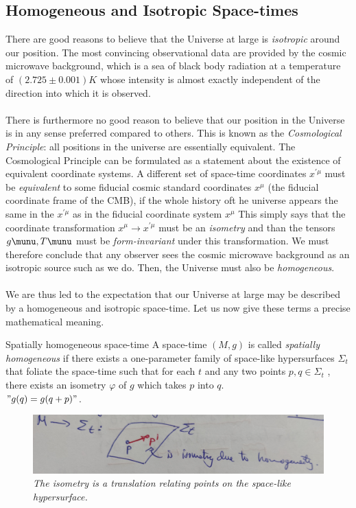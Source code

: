 	
	\subsection{Homogeneous and Isotropic Space-times}
	There are good reasons to believe that the Universe at large is \emph{isotropic}
	around our position. The most convincing observational data are provided by the cosmic microwave background, which is a sea of black body
	radiation at a temperature of $(2.725 ± 0.001) K$ whose intensity is almost
	exactly independent of the direction into which it is observed.\\
	\\
	There is furthermore no good reason to believe that our position in the
	Universe is in any sense preferred compared to others.  This is known as the \emph{Cosmological Principle}: all positions in the universe are essentially equivalent. The Cosmological Principle can be formulated as a statement about the existence of equivalent coordinate systems. A different set of space-time coordinates $x^{\prime \mu}$ must be \emph{equivalent} to some fiducial cosmic standard coordinates $x^\mu$ (the fiducial coordinate frame of the CMB), if the whole history oft he universe appears the same in the $x^{\prime \mu}$ as in the fiducial coordinate system $x^\mu$ This simply says that the coordinate transformation $x^\mu\rightarrow x^{\prime\mu}$ must be an \emph{isometry} and than the tensors $g\munu, T\munu$ must be \emph{form-invariant} under this transformation. We must therefore
	conclude that any observer sees the cosmic microwave background as an isotropic source such as we do. Then, the Universe must also be
	\emph{homogeneous}.\\
	\\
	We are thus led to the expectation that our Universe at large may be
	described by a homogeneous and isotropic space-time. Let us now give
	these terms a precise mathematical meaning.
	\begin{mybox}{Spatially homogeneous space-time}
		A space-time $(M, g)$ is called \emph{spatially homogeneous} if there exists a
		one-parameter family of space-like hypersurfaces $\Sigma_t$ that foliate the
		space-time such that for each $t$ and any two points $p, q ∈ \Sigma_t$ , there exists
		an isometry $φ$ of $g$ which takes $p$ into $q$.\\
		$"g(q) = g(q+p)"$.
	\end{mybox}
\begin{figure}[h!]
	\centering
	\includegraphics[width=0.7\linewidth]{gfx/HomogeneousSpacetime}
	\caption{\itshape The isometry is a translation relating points on the space-like hypersurface.}
	\label{fig:homogeneousspacetime}
\end{figure}




